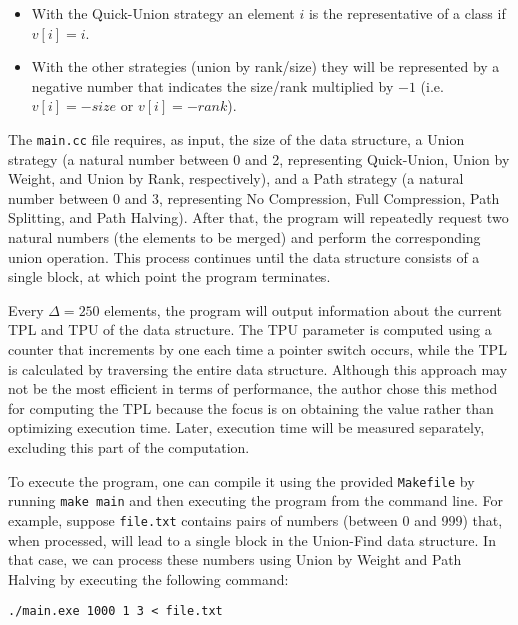 \begin{itemize}
    \item With the Quick-Union strategy an element $i$ is the representative of a class if $v[i] = i$.
    \item With the other strategies (union by rank/size) they will be represented by a negative number that indicates the size/rank multiplied by $-1$ (i.e. $v[i] = -size$ or $v[i] = -rank$).
\end{itemize}

The \texttt{main.cc} file requires, as input, the size of the data structure, a Union strategy (a natural number between 0 and 2, representing Quick-Union, Union by Weight, and Union by Rank, respectively), and a Path strategy (a natural number between 0 and 3, representing No Compression, Full Compression, Path Splitting, and Path Halving). After that, the program will repeatedly request two natural numbers (the elements to be merged) and perform the corresponding union operation. This process continues until the data structure consists of a single block, at which point the program terminates.

Every $\Delta = 250$ elements, the program will output information about the current TPL and TPU of the data structure. The TPU parameter is computed using a counter that increments by one each time a pointer switch occurs, while the TPL is calculated by traversing the entire data structure. Although this approach may not be the most efficient in terms of performance, the author chose this method for computing the TPL because the focus is on obtaining the value rather than optimizing execution time. Later, execution time will be measured separately, excluding this part of the computation.

To execute the program, one can compile it using the provided \texttt{Makefile} by running \texttt{make main} and then executing the program from the command line. For example, suppose \texttt{file.txt} contains pairs of numbers (between 0 and 999) that, when processed, will lead to a single block in the Union-Find data structure. In that case, we can process these numbers using Union by Weight and Path Halving by executing the following command:

\texttt{./main.exe 1000 1 3 < file.txt}
